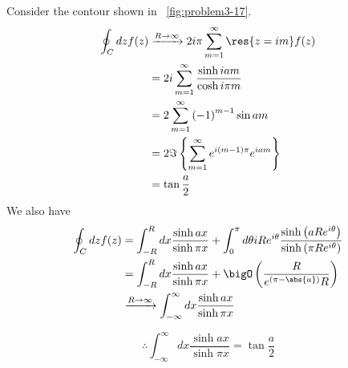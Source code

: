 Consider the contour shown in ~\ref{fig:problem3-17}.
\begin{align*}
    \oint_C dz f(z)
    &\xrightarrow{R \rightarrow \infty} 2i\pi \sum_{m=1}^\infty \res{z = im} f(z) \\
    &= 2i \sum_{m=1}^\infty \frac{\sinh iam}{\cosh i\pi m} \\
    &= 2\sum_{m=1}^\infty {(-1)}^{m-1} \sin am \\
    &= 2 \Im\left\{ \sum_{m=1}^\infty e^{i(m-1)\pi} e^{iam} \right\} \\
    &= \tan \frac{a}{2}
\end{align*}
We also have
\begin{align*}
    \oint_C dz f(z)
    &= \int_{-R}^R dx \frac{\sinh ax}{\sinh \pi x}
     + \int_0^\pi d\theta iRe^{i\theta} \frac{\sinh\left( aRe^{i\theta} \right)}{\sinh\left( \pi Re^{i\theta} \right)} \\ 
    &= \int_{-R}^R dx \frac{\sinh ax}{\sinh \pi x}
     + \bigO\left( \frac{R}{e^{\left( \pi - \abs{a} \right)}R} \right) \\
    &\xrightarrow{R \rightarrow \infty} \int_{-\infty}^\infty dx \frac{\sinh ax}{\sinh \pi x}
\end{align*}

\[
    \therefore \int_{-\infty}^\infty dx \frac{\sinh ax}{\sinh \pi x} = \tan \frac{a}{2}
\]
